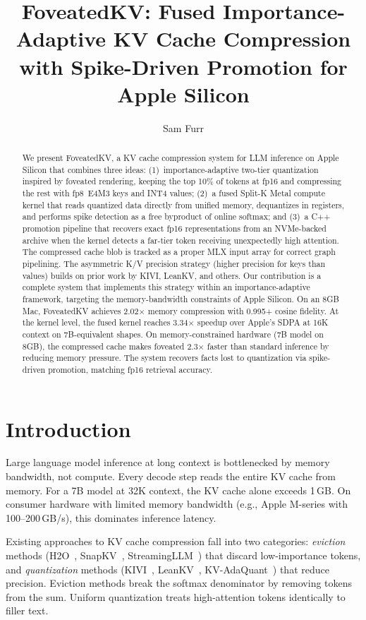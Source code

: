 \documentclass{article}
\title{FoveatedKV: Fused Importance-Adaptive KV Cache Compression\\with Spike-Driven Promotion for Apple Silicon}
\author{Sam Furr}
\date{}
\begin{document}
\maketitle

\begin{abstract}
We present FoveatedKV, a KV cache compression system for LLM inference
on Apple Silicon that combines three ideas: (1)~importance-adaptive
two-tier quantization inspired by foveated rendering, keeping the top
10\% of tokens at fp16 and compressing the rest with fp8~E4M3 keys and
INT4 values; (2)~a fused Split-K Metal compute kernel that reads
quantized data directly from unified memory, dequantizes in registers,
and performs spike detection as a free byproduct of online softmax; and
(3)~a C++ promotion pipeline that recovers exact fp16 representations
from an NVMe-backed archive when the kernel detects a far-tier token
receiving unexpectedly high attention. The compressed cache blob is tracked
as a proper MLX input array for correct graph pipelining. The asymmetric
K/V precision strategy (higher precision for keys than values) builds on
prior work by KIVI, LeanKV, and others. Our contribution is a complete
system that implements this strategy within an importance-adaptive
framework, targeting the memory-bandwidth constraints of Apple Silicon.
On an 8GB Mac, FoveatedKV achieves 2.02$\times$ memory compression with
0.995+ cosine fidelity. At the kernel level, the fused kernel reaches
3.34$\times$ speedup over Apple's SDPA at 16K context on 7B-equivalent
shapes. On memory-constrained hardware (7B model on 8GB), the compressed
cache makes foveated 2.3$\times$ faster than standard inference by
reducing memory pressure. The system recovers facts lost to quantization
via spike-driven promotion, matching fp16 retrieval accuracy.
\end{abstract}

\section{Introduction}

Large language model inference at long context is bottlenecked by memory
bandwidth, not compute. Every decode step reads the entire KV cache from
memory. For a 7B model at 32K context, the KV cache alone exceeds 1\,GB.
On consumer hardware with limited memory bandwidth (e.g., Apple M-series
with 100--200\,GB/s), this dominates inference latency.

Existing approaches to KV cache compression fall into two categories:
\emph{eviction} methods (H2O~\cite{h2o}, SnapKV~\cite{snapkv},
StreamingLLM~\cite{streamingllm}) that discard low-importance tokens,
and \emph{quantization} methods (KIVI~\cite{kivi},
LeanKV~\cite{leankv}, KV-AdaQuant~\cite{kvadaquant}) that reduce
precision. Eviction methods break the softmax denominator by removing
tokens from the sum. Uniform quantization treats high-attention tokens
identically to filler text.
\end{document}
